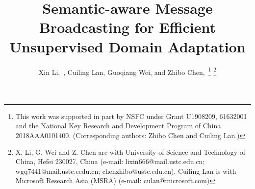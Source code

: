 \documentclass[journal]{IEEEtran}
\begin{document}
\title{Semantic-aware Message Broadcasting for Efficient Unsupervised Domain Adaptation}


\author{Xin Li,~, Cuiling Lan, Guoqiang Wei,  and  Zhibo Chen,~\thanks{This work was supported in part by NSFC under Grant U1908209, 61632001 and the National Key Research and Development Program of China 2018AAA0101400. (Corresponding authors: Zhibo Chen and Cuiling Lan.)}
\thanks{X. Li, G. Wei and Z. Chen are with  University of Science and Technology of China, Hefei 230027, China (e-mail: lixin666@mail.ustc.edu.cn; wgq7441@mail.ustc.eedu.cn;  chenzhibo@ustc.edu.cn). Cuiling Lan is with Microsoft Research Asia (MSRA) (e-mail: culan@microsoft.com)}
}  



















\newcommand{\ieno}{\textit{i.e.}}
\newcommand{\egno}{\textit{e.g.}}
\newcommand{\etal}{\textit{et al.}}
\newcommand{\tcr}{\textcolor{}}
\newcommand{\etcno}{\textit{etc}}

\maketitle
\end{document}
